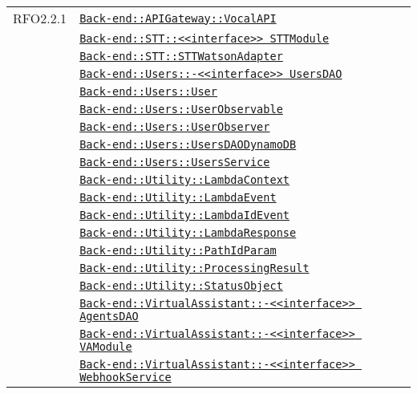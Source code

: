 \begin{longtable}{|>{\centering}m{3cm}|m{10cm}<{\centering}|}
RFO2.2.1 & \hyperref[Back-end::APIGateway::VocalAPI]{\texttt{Back-end::APIGateway::VocalAPI}}\\
& \hyperref[Back-end::STT::<<interface>> STTModule]{\texttt{Back-end::STT::<<interface>> STTModule}}\\
& \hyperref[Back-end::STT::STTWatsonAdapter]{\texttt{Back-end::STT::STTWatsonAdapter}}\\
& \hyperref[Back-end::Users::<<interface>> UsersDAO]{\texttt{Back-end::Users::-\linebreak <<interface>> UsersDAO}}\\
& \hyperref[Back-end::Users::User]{\texttt{Back-end::Users::User}}\\
& \hyperref[Back-end::Users::UserObservable]{\texttt{Back-end::Users::UserObservable}}\\
& \hyperref[Back-end::Users::UserObserver]{\texttt{Back-end::Users::UserObserver}}\\
& \hyperref[Back-end::Users::UsersDAODynamoDB]{\texttt{Back-end::Users::UsersDAODynamoDB}}\\
& \hyperref[Back-end::Users::UsersService]{\texttt{Back-end::Users::UsersService}}\\
& \hyperref[Back-end::Utility::LambdaContext]{\texttt{Back-end::Utility::LambdaContext}}\\
& \hyperref[Back-end::Utility::LambdaEvent]{\texttt{Back-end::Utility::LambdaEvent}}\\
& \hyperref[Back-end::Utility::LambdaIdEvent]{\texttt{Back-end::Utility::LambdaIdEvent}}\\
& \hyperref[Back-end::Utility::LambdaResponse]{\texttt{Back-end::Utility::LambdaResponse}}\\
& \hyperref[Back-end::Utility::PathIdParam]{\texttt{Back-end::Utility::PathIdParam}}\\
& \hyperref[Back-end::Utility::ProcessingResult]{\texttt{Back-end::Utility::ProcessingResult}}\\
& \hyperref[Back-end::Utility::StatusObject]{\texttt{Back-end::Utility::StatusObject}}\\
& \hyperref[Back-end::VirtualAssistant::<<interface>> AgentsDAO]{\texttt{Back-end::VirtualAssistant::-\linebreak <<interface>> AgentsDAO}}\\
& \hyperref[Back-end::VirtualAssistant::<<interface>> VAModule]{\texttt{Back-end::VirtualAssistant::-\linebreak <<interface>> VAModule}}\\
& \hyperref[Back-end::VirtualAssistant::<<interface>> WebhookService]{\texttt{Back-end::VirtualAssistant::-\linebreak <<interface>> WebhookService}}\\

\end{longtable}
